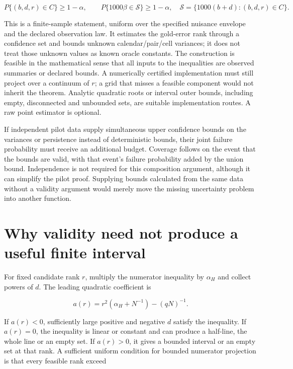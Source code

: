 \[
 P\{(b,d,r)\in C\}\geq1-\alpha,
 \qquad
 P\{1000\beta\in\mathcal S\}\geq1-\alpha,
 \quad \mathcal S=\{1000(b+d):(b,d,r)\in C\}.
\]

This is a finite-sample statement, uniform over the specified nuisance
envelope and the declared observation law. It estimates the gold-error
rank through a confidence set and bounds unknown calendar/pair/cell
variances; it does not treat those unknown values as known oracle
constants. The construction is feasible in the mathematical sense that
all inputs to the inequalities are observed summaries or declared
bounds. A numerically certified implementation must still project over a
continuum of \(r\); a grid that misses a feasible component would not
inherit the theorem. Analytic quadratic roots or interval outer bounds,
including empty, disconnected and unbounded sets, are suitable
implementation routes. A raw point estimator is optional.

If independent pilot data supply simultaneous upper confidence bounds on
the variances or persistence instead of deterministic bounds, their
joint failure probability must receive an additional budget. Coverage
follows on the event that the bounds are valid, with that event's
failure probability added by the union bound. Independence is not
required for this composition argument, although it can simplify the
pilot proof. Supplying bounds calculated from the same data without a
validity argument would merely move the missing uncertainty problem into
another function.

\hypertarget{why-validity-need-not-produce-a-useful-finite-interval}{%
\section{Why validity need not produce a useful finite
interval}\label{why-validity-need-not-produce-a-useful-finite-interval}}

For fixed candidate rank \(r\), multiply the numerator inequality by
\(\alpha_H\) and collect powers of \(d\). The leading quadratic
coefficient is

\[
 a(r)=r^2(\alpha_H+N^{-1})-(qN)^{-1}.
\]

If \(a(r)<0\), sufficiently large positive and negative \(d\) satisfy
the inequality. If \(a(r)=0\), the inequality is linear or constant and
can produce a half-line, the whole line or an empty set. If \(a(r)>0\),
it gives a bounded interval or an empty set at that rank. A sufficient
uniform condition for bounded numerator projection is that every
feasible rank exceed


